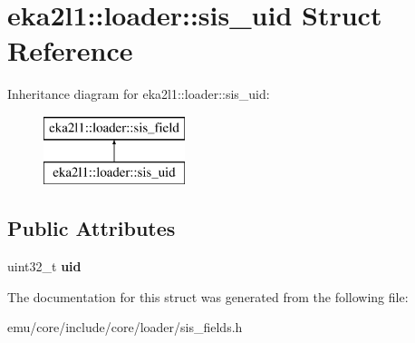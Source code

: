 \hypertarget{structeka2l1_1_1loader_1_1sis__uid}{}\section{eka2l1\+:\+:loader\+:\+:sis\+\_\+uid Struct Reference}
\label{structeka2l1_1_1loader_1_1sis__uid}
Inheritance diagram for eka2l1\+:\+:loader\+:\+:sis\+\_\+uid\+:\begin{figure}[H]
\begin{center}
\leavevmode
\includegraphics[height=2.000000cm]{structeka2l1_1_1loader_1_1sis__uid}
\end{center}
\end{figure}
\subsection*{Public Attributes}
\begin{DoxyCompactItemize}
\item 
\mbox{\label{structeka2l1_1_1loader_1_1sis__uid_a6f57fcb38c6967f81d6dcae82b9ec2d7}} 
uint32\+\_\+t {\bfseries uid}
\end{DoxyCompactItemize}


The documentation for this struct was generated from the following file\+:\begin{DoxyCompactItemize}
\item 
emu/core/include/core/loader/sis\+\_\+fields.\+h\end{DoxyCompactItemize}

